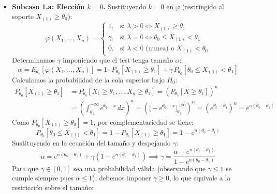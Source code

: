 \begin{ejercicio}
\begin{description}
    \begin{itemize}
        \item \textbf{Subcaso 1.a: Elección $k = 0$.} Sustituyendo $k = 0$ en $\varphi$ (restringido al soporte $X_{(1)} \ge \theta_0$):
        \begin{equation*}
            \varphi(X_1, \dots, X_n) =
            \begin{cases}
                1, & \text{si } \lambda > 0 \iff X_{(1)} \ge \theta_1 \\
                \gamma, & \text{si } \lambda = 0 \iff \theta_0 \le X_{(1)} < \theta_1 \\
                0, & \text{si } \lambda < 0 \text{ (nunca) o } X_{(1)} < \theta_0
            \end{cases}
        \end{equation*}
        Determinamos $\gamma$ imponiendo que el test tenga tamaño $\alpha$:
        \begin{equation*}
            \alpha = E_{\theta_0}[\varphi(X_1, \dots, X_n)] = 1 \cdot P_{\theta_0}[X_{(1)} \ge \theta_1] + \gamma \, P_{\theta_0}[\theta_0 \le X_{(1)} < \theta_1]
        \end{equation*}
        Calculamos la probabilidad de la cola superior bajo $H_0$:
        \begin{align*}
            P_{\theta_0}[X_{(1)} \ge \theta_1] &= P_{\theta_0}[X_1 \ge \theta_1, \dots, X_n \ge \theta_1] = \left(P_{\theta_0}[X \ge \theta_1]\right)^n \\
            &= \left( \int_{\theta_1}^{+\infty} e^{\theta_0 - x} \, dx \right)^n = \left( \Big[-e^{\theta_0 - x}\Big]_{\theta_1}^{+\infty} \right)^n = \left(e^{\theta_0 - \theta_1}\right)^n = e^{n(\theta_0 - \theta_1)}
        \end{align*}
        Como $P_{\theta_0}[X_{(1)} \ge \theta_0] = 1$, por complementariedad se tiene:
        \begin{equation*}
            P_{\theta_0}[\theta_0 \le X_{(1)} < \theta_1] = 1 - P_{\theta_0}[X_{(1)} \ge \theta_1] = 1 - e^{n(\theta_0 - \theta_1)}
        \end{equation*}
        Sustituyendo en la ecuación del tamaño y despejando $\gamma$:
        \begin{equation*}
            \alpha = e^{n(\theta_0 - \theta_1)} + \gamma \left(1 - e^{n(\theta_0 - \theta_1)}\right) \implies \gamma = \frac{\alpha - e^{n(\theta_0 - \theta_1)}}{1 - e^{n(\theta_0 - \theta_1)}}
        \end{equation*}
        Para que $\gamma \in [0, 1]$ sea una probabilidad válida (observando que $\gamma \le 1$ se cumple siempre pues $\alpha \le 1$), debemos imponer $\gamma \ge 0$, lo que equivale a la restricción sobre el tamaño:

\end{itemize}
\end{description}
\end{ejercicio}
